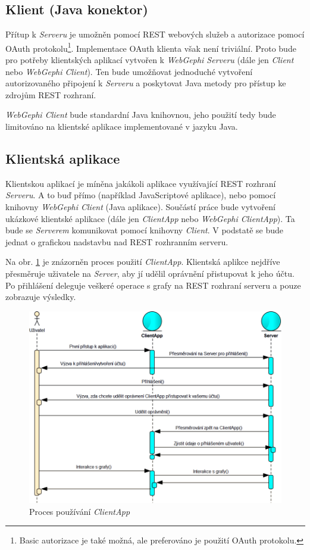 \documentclass[thesis=M,czech]{FITthesis}[2014/05/6]
\begin{document}
\subsection{Klient (Java konektor)}
Přítup k \textit{Serveru} je umožněn pomocí REST webových služeb a autorizace pomocí OAuth protokolu\footnote{Basic autorizace je také možná, ale preferováno je použití OAuth protokolu.}.
Implementace OAuth klienta však není triviální. Proto bude pro potřeby klientských aplikací vytvořen  k \textit{WebGephi Serveru} (dále jen \textit{Client} nebo \textit{WebGephi Client}).
Ten bude umožňovat jednoduché vytvoření autorizovaného připojení k \textit{Serveru} a poskytovat Java metody pro přístup ke zdrojům REST rozhraní.

\textit{WebGephi Client} bude standardní Java knihovnou, jeho použití tedy bude limitováno na klientské aplikace implementované v jazyku Java.

\subsection{Klientská aplikace}
Klientskou aplikací je míněna jakákoli aplikace využívající REST rozhraní \textit{Serveru}. A to buď přímo (například JavaScriptové aplikace), nebo pomocí knihovny \textit{WebGephi Client} (Java aplikace).
Součástí práce bude vytvoření ukázkové klientské aplikace (dále jen \textit{ClientApp} nebo \textit{WebGephi ClientApp}). Ta bude se \textit{Serverem} komunikovat pomocí knihovny \textit{Client}.
V podstatě se bude jednat o grafickou nadstavbu nad REST rozhranním serveru.

Na obr. \ref{fig:clientApp-proces} je znázorněn proces použití \textit{ClientApp}. Klientská aplikce nejdříve přesměruje uživatele na \textit{Server}, aby jí udělil oprávnění přistupovat k jeho účtu.
Po přihlášení deleguje veškeré operace s grafy na REST rozhraní serveru a pouze zobrazuje výsledky.

\begin{figure}\centering
 	\includegraphics[width=1\textwidth]{images/diagram/clientApp-proces}
 	\caption[Proces používání \textit{ClientApp}]{Proces používání \textit{ClientApp}}\label{fig:clientApp-proces}
\end{figure}
\end{document}
